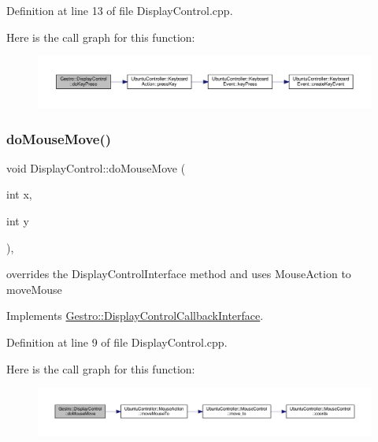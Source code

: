 Definition at line 13 of file Display\+Control.\+cpp.

Here is the call graph for this function\+:
\nopagebreak
\begin{figure}[H]
\begin{center}
\leavevmode
\includegraphics[width=350pt]{class_gestro_1_1_display_control_aa5af48425f7ba40012b2a7db5fabed45_cgraph}
\end{center}
\end{figure}
\mbox{\label{class_gestro_1_1_display_control_aa8c509a1e17ba12d164dcfe43cf281d4}} 
\subsubsection{\texorpdfstring{do\+Mouse\+Move()}{doMouseMove()}}
{\footnotesize\ttfamily void Display\+Control\+::do\+Mouse\+Move (\begin{DoxyParamCaption}\item[{int}]{x,  }\item[{int}]{y }\end{DoxyParamCaption})\hspace{0.3cm}{\ttfamily [override]}, {\ttfamily [virtual]}}

overrides the Display\+Control\+Interface method and uses Mouse\+Action to move\+Mouse 

Implements \hyperlink{class_gestro_1_1_display_control_callback_interface_a35d453c78b578d061c89c95b3ae9ee8a}{Gestro\+::\+Display\+Control\+Callback\+Interface}.



Definition at line 9 of file Display\+Control.\+cpp.

Here is the call graph for this function\+:
\nopagebreak
\begin{figure}[H]
\begin{center}
\leavevmode
\includegraphics[width=350pt]{class_gestro_1_1_display_control_aa8c509a1e17ba12d164dcfe43cf281d4_cgraph}
\end{center}
\end{figure}
\mbox{\label{class_gestro_1_1_display_control_a25f685ea6bf001e53c7d17410f2a24ea}} 
